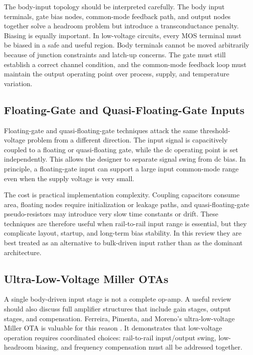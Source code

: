 \documentclass[conference,a4paper]{IEEEtran}
\begin{document}
The body-input topology should be interpreted carefully. The body input terminals, gate bias nodes, common-mode feedback path, and output nodes together solve a headroom problem but introduce a transconductance penalty. Biasing is equally important. In low-voltage circuits, every MOS terminal must be biased in a safe and useful region. Body terminals cannot be moved arbitrarily because of junction constraints and latch-up concerns. The gate must still establish a correct channel condition, and the common-mode feedback loop must maintain the output operating point over process, supply, and temperature variation.

\subsection{Floating-Gate and Quasi-Floating-Gate Inputs}
Floating-gate and quasi-floating-gate techniques attack the same threshold-voltage problem from a different direction. The input signal is capacitively coupled to a floating or quasi-floating gate, while the dc operating point is set independently. This allows the designer to separate signal swing from dc bias. In principle, a floating-gate input can support a large input common-mode range even when the supply voltage is very small.

The cost is practical implementation complexity. Coupling capacitors consume area, floating nodes require initialization or leakage paths, and quasi-floating-gate pseudo-resistors may introduce very slow time constants or drift. These techniques are therefore useful when rail-to-rail input range is essential, but they complicate layout, startup, and long-term bias stability. In this review they are best treated as an alternative to bulk-driven input rather than as the dominant architecture.

\subsection{Ultra-Low-Voltage Miller OTAs}
A single body-driven input stage is not a complete op-amp. A useful review should also discuss full amplifier structures that include gain stages, output stages, and compensation. Ferreira, Pimenta, and Moreno's ultra-low-voltage Miller OTA is valuable for this reason \cite{ferreira2007miller}. It demonstrates that low-voltage operation requires coordinated choices: rail-to-rail input/output swing, low-headroom biasing, and frequency compensation must all be addressed together.
\end{document}
